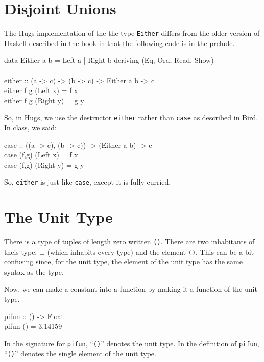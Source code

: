 \documentclass[11pt]{article}
\begin{document}

\section{Disjoint Unions}


The Hugs implementation of the the type {\tt{Either}} differs from the
older version of Haskell described in the book in that the following
code is in the prelude.

\begin{program*}
\> data  Either a b  =  Left a | Right b   deriving (Eq, Ord, Read, Show) \\
\>  \\
\> either               :: (a -> c) -> (b -> c) -> Either a b -> c \\
\> either f g (Left x)  =  f x \\
\> either f g (Right y) =  g y 
\end{program*}

So, in Hugs, we use the destructor {\tt{either}} rather than {\tt{case}} as described in Bird. In class, we said:

\begin{program*}
\> case                :: ((a -> c), (b -> c)) -> (Either a b) -> c \\
\> case (f,g) (Left x)  =  f x \\
\> case (f,g) (Right y) =  g y 
\end{program*}

So, {\tt{either}} is just like {\tt{case}}, except it is  fully curried.

\section{The Unit Type}

There is a type of tuples of length zero written {\tt{()}}.  There are
two inhabitants of theis type, $\bot$ (which inhabits every type) and
the element {\tt{()}}.  This can be a bit confusing since, for the
unit type, the element of the unit type has the same syntax as the
type.

Now, we can make a constant into a function by making it a function of
the unit type.
\begin{program*}
\> pifun :: () -> Float \\
\> pifun () = 3.14159
\end{program*}
In the signature for {\tt{pifun}}, ``{\tt{()}}'' denotes the unit type.  In the
definition of {\tt{pifun}}, ``{\tt{()}}'' denotes the single element of the
unit type.
\end{document}
